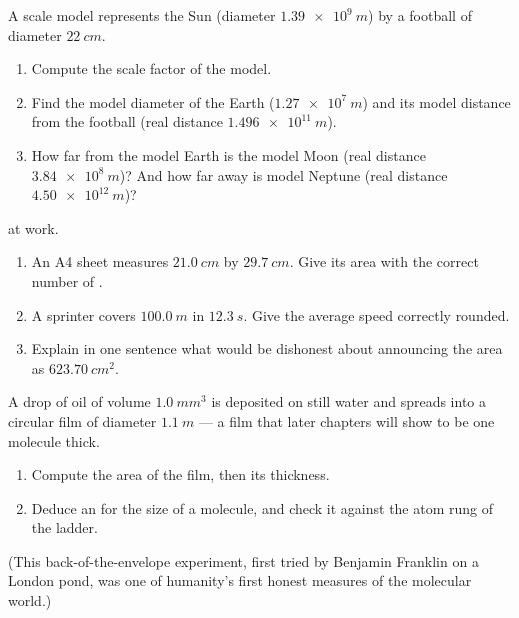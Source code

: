 \begin{exercise}[$\star\star$]\label{exo:g10:orders-of-magnitude:10}
A scale model represents the Sun (diameter $\qty{1.39e9}{m}$) by a
football of diameter $\qty{22}{cm}$.
\begin{enumerate}
  \item Compute the scale factor of the model.
  \item Find the model diameter of the Earth ($\qty{1.27e7}{m}$) and
        its model distance from the football (real distance
        $\qty{1.496e11}{m}$).
  \item How far from the model Earth is the model Moon (real distance
        $\qty{3.84e8}{m}$)? And how far away is model Neptune (real
        distance $\qty{4.50e12}{m}$)?
\end{enumerate}
\end{exercise}

\begin{exercise}[$\star\star$]\label{exo:g10:orders-of-magnitude:11}
 at work.
\begin{enumerate}
  \item An A4 sheet measures $\qty{21.0}{cm}$ by $\qty{29.7}{cm}$.
        Give its area with the correct number of .
  \item A sprinter covers $\qty{100.0}{m}$ in $\qty{12.3}{s}$. Give
        the average speed correctly rounded.
  \item Explain in one sentence what would be dishonest about
        announcing the area as $\qty{623.70}{cm^2}$.
\end{enumerate}
\end{exercise}

\begin{exercise}[$\star\star\star$]\label{exo:g10:orders-of-magnitude:12}
A drop of oil of volume $\qty{1.0}{mm^3}$ is deposited on still water
and spreads into a circular film of diameter $\qty{1.1}{m}$ --- a film
that later chapters will show to be one molecule thick.
\begin{enumerate}
  \item Compute the area of the film, then its thickness.
  \item Deduce an  for the size of a molecule, and
        check it against the atom rung of the ladder.
\end{enumerate}
(This back-of-the-envelope experiment, first tried by Benjamin
Franklin on a London pond, was one of humanity's first honest measures
of the molecular world.)
\end{exercise}

